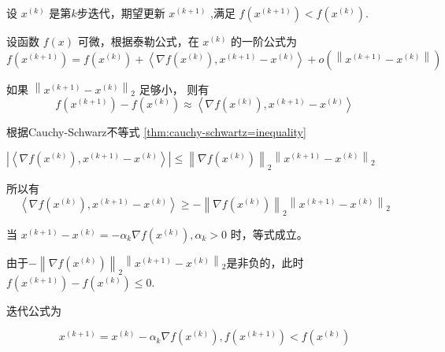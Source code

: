 设 $ x^{(k)} $ 是第$k$步迭代，期望更新 $ x^{(k+1)} $ ,满足 $ f\left(x^{(k+1)}\right)<f\left(x^{(k)}\right) $.

设函数 $ f(x) $ 可微，根据泰勒公式，在 $ x^{(k)} $ 的一阶公式为
\begin{equation}
f\left(x^{(k+1)}\right)=f\left(x^{(k)}\right)+\left\langle\nabla f\left(x^{(k)}\right), x^{(k+1)}-x^{(k)}\right\rangle+o\left(\left\|x^{(k+1)}-x^{(k)}\right\|\right)
\end{equation}

如果 $ \left\|x^{(k+1)}-x^{(k)}\right\|_{2} $ 足够小， 则有
\begin{equation}
f\left(x^{(k+1)}\right)-f\left(x^{(k)}\right) \approx\left\langle\nabla f\left(x^{(k)}\right), x^{(k+1)}-x^{(k)}\right\rangle
\end{equation}

\begin{corollary}
    根据Cauchy-Schwarz不等式 \ref{thm:cauchy-schwartz=inequality}

    $ \left|\left\langle\nabla f\left(x^{(k)}\right), x^{(k+1)}-x^{(k)}\right\rangle\right| \leq\left\|\nabla f\left(x^{(k)}\right)\right\|_{2}\left\|x^{(k+1)}-x^{(k)}\right\|_{2} $

    所以有
    \begin{equation}
\left\langle\nabla f\left(x^{(k)}\right), x^{(k+1)}-x^{(k)}\right\rangle \geq -\left\|\nabla f\left(x^{(k)}\right)\right\|_{2}\left\|x^{(k+1)}-x^{(k)}\right\|_{2}
\end{equation}

当 $ x^{(k+1)}-x^{(k)}=-\alpha_{k} \nabla f\left(x^{(k)}\right), \alpha_{k}>0 $ 时，等式成立。

由于$-\left\|\nabla f\left(x^{(k)}\right)\right\|_{2}\left\|x^{(k+1)}-x^{(k)}\right\|_{2}$是非负的，此时$f\left(x^{(k+1)}\right)-f\left(x^{(k)}\right) \le 0$.
\end{corollary}

迭代公式为 

\begin{equation}  x^{(k+1)}=x^{(k)}-\alpha_{k} \nabla f\left(x^{(k)}\right) , f\left(x^{(k+1)}\right)<f\left(x^{(k)}\right) \end{equation}



